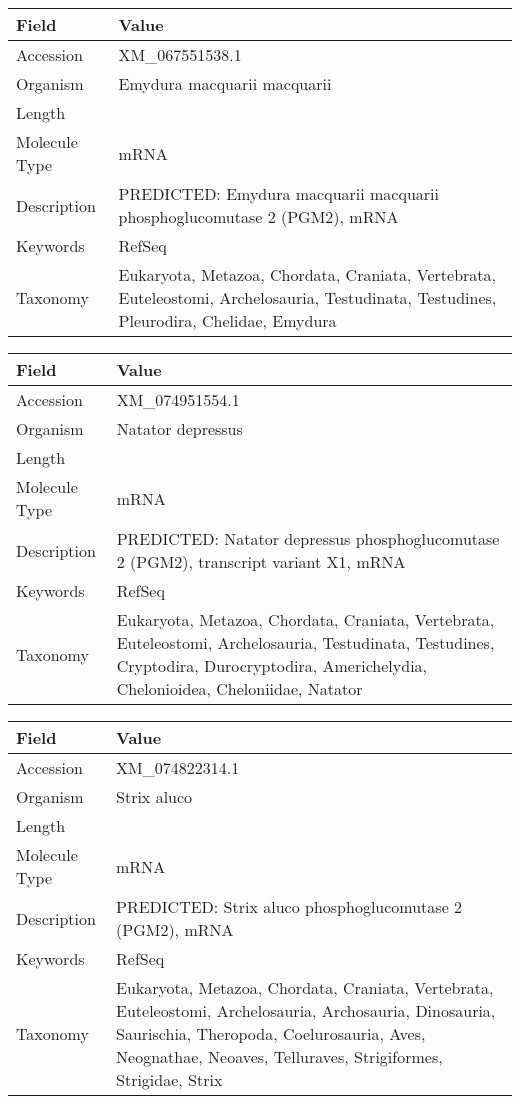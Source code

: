 \documentclass[10pt]{article}
\begin{document}
\vspace{1em}
{\footnotesize
\begin{longtable}{>{\raggedright\arraybackslash}p{4.5cm} >{\raggedright\arraybackslash}p{11.5cm}}
\textbf{Field} & \textbf{Value} \\
\hline
Accession & XM\_067551538.1 \\
Organism & Emydura macquarii macquarii \\
Length & 4567 \\
Molecule Type & mRNA \\
Description & PREDICTED: Emydura macquarii macquarii phosphoglucomutase 2 (PGM2), mRNA \\
Keywords & RefSeq \\
Taxonomy & Eukaryota, Metazoa, Chordata, Craniata, Vertebrata, Euteleostomi, Archelosauria, Testudinata, Testudines, Pleurodira, Chelidae, Emydura \\
\end{longtable}
}

\vspace{1em}
{\footnotesize
\begin{longtable}{>{\raggedright\arraybackslash}p{4.5cm} >{\raggedright\arraybackslash}p{11.5cm}}
\textbf{Field} & \textbf{Value} \\
\hline
Accession & XM\_074951554.1 \\
Organism & Natator depressus \\
Length & 4092 \\
Molecule Type & mRNA \\
Description & PREDICTED: Natator depressus phosphoglucomutase 2 (PGM2), transcript variant X1, mRNA \\
Keywords & RefSeq \\
Taxonomy & Eukaryota, Metazoa, Chordata, Craniata, Vertebrata, Euteleostomi, Archelosauria, Testudinata, Testudines, Cryptodira, Durocryptodira, Americhelydia, Chelonioidea, Cheloniidae, Natator \\
\end{longtable}
}

\vspace{1em}
{\footnotesize
\begin{longtable}{>{\raggedright\arraybackslash}p{4.5cm} >{\raggedright\arraybackslash}p{11.5cm}}
\textbf{Field} & \textbf{Value} \\
\hline
Accession & XM\_074822314.1 \\
Organism & Strix aluco \\
Length & 2239 \\
Molecule Type & mRNA \\
Description & PREDICTED: Strix aluco phosphoglucomutase 2 (PGM2), mRNA \\
Keywords & RefSeq \\
Taxonomy & Eukaryota, Metazoa, Chordata, Craniata, Vertebrata, Euteleostomi, Archelosauria, Archosauria, Dinosauria, Saurischia, Theropoda, Coelurosauria, Aves, Neognathae, Neoaves, Telluraves, Strigiformes, Strigidae, Strix \\
\end{longtable}
}
\end{document}
